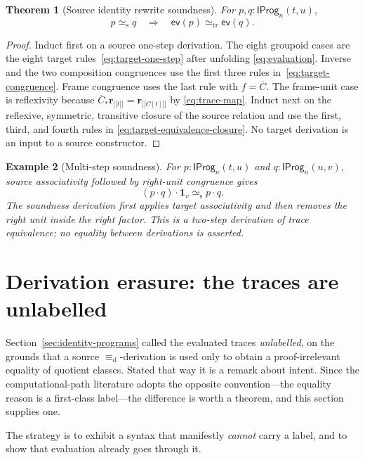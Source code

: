 \documentclass[10pt,reqno]{amsart}
\newtheorem{theorem}{Theorem}[section]
\newtheorem{example}[theorem]{Example}
\newcommand{\TrEq}{\mathrel{\simeq_{\mathrm{tr}}}}
\newcommand{\IProg}{\mathsf{IProg}}
\newcommand{\ev}{\mathsf{ev}}
\newcommand{\den}[1]{\mathopen{\lbrack\!\lbrack}#1\mathclose{\rbrack\!\rbrack}}
\newcommand{\defeq}{\mathrel{\equiv_{\mathrm d}}}
\newcommand{\srweq}{\mathrel{\simeq_{\mathrm s}}}
\begin{document}
\begin{theorem}[Source identity rewrite soundness]
\label{thm:identity-soundness}
For \(p,q:\IProg_n(t,u)\),
\[
          p\srweq q
          \quad\Longrightarrow\quad
          \ev(p)\TrEq\ev(q).
\tag{8.16}\label{eq:rewrite-soundness}
\]
\end{theorem}

\begin{proof}
Induct first on a source one-step derivation.  The eight groupoid cases are
the eight target rules~\eqref{eq:target-one-step} after unfolding
\eqref{eq:evaluation}.  Inverse and the two composition congruences use the
first three rules in~\eqref{eq:target-congruence}.  Frame congruence uses the
last rule with \(f=\overline C\).  The frame-unit case is reflexivity because
\(\overline C_\ast\mathbf r_{\den t}=\mathbf r_{\den{C[t]}}\) by
\eqref{eq:trace-map}.  Induct next on the reflexive, symmetric, transitive
closure of the source relation and use the first, third, and fourth rules in
\eqref{eq:target-equivalence-closure}.  No target derivation is an input to a
source constructor.
\end{proof}

\begin{example}[Multi-step soundness]
\label{ex:two-step-coherence}
For \(p:\IProg_n(t,u)\) and \(q:\IProg_n(u,v)\), source associativity
followed by right-unit congruence gives
\[
       (p\cdot q)\cdot\mathbf{1}_v
          \srweq p\cdot q.
\]
The soundness derivation first applies target associativity and then removes
the right unit inside the right factor.  This is a two-step derivation of
trace equivalence; no equality between derivations is asserted.
\end{example}

\section{Derivation erasure: the traces are unlabelled}
\label{sec:erasure}

Section~\ref{sec:identity-programs} called the evaluated traces
\emph{unlabelled}, on the grounds that a source \(\defeq\)-derivation is used
only to obtain a proof-irrelevant equality of quotient classes.  Stated that
way it is a remark about intent.  Since the computational-path literature
adopts the opposite convention---the equality reason is a first-class
label---the difference is worth a theorem, and this section supplies one.

The strategy is to exhibit a syntax that manifestly \emph{cannot} carry a
label, and to show that evaluation already goes through it.
\end{document}
